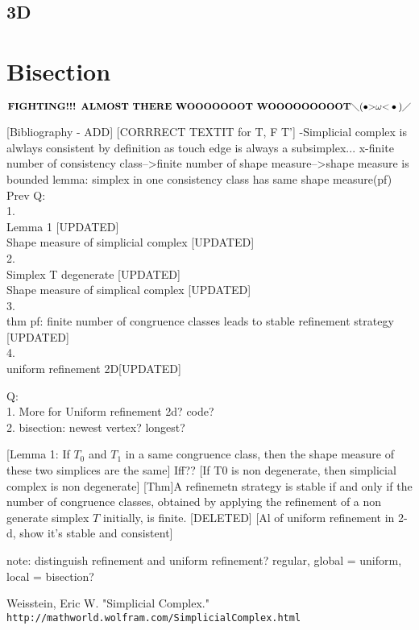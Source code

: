 \documentclass{article}
\begin{document}
    \subsection{3D}

    \section{Bisection}

    \newpage
    $\textbf{FIGHTING!!! ALMOST THERE WOOOOOOOT WOOOOOOOOOT}  \diagdown{(\bullet{ > }\omega{ < }\bullet{})} \diagup{}$


    [Bibliography - ADD]
    [CORRRECT TEXTIT for T, F T']
    -Simplicial complex is alwlays consistent by definition as touch edge is always a subsimplex...
    x-finite number of consistency class-->finite number of shape measure-->shape measure is bounded
    lemma: simplex in one consistency class has same shape measure(pf)
    \newpage
    Prev Q:\\
    1.\\
    Lemma 1 [UPDATED]\\
    Shape measure of simplicial complex [UPDATED]\\
    2. \\
    Simplex T degenerate [UPDATED]\\
    Shape measure of simplical complex  [UPDATED]\\
    3. \\
    thm pf: finite number of congruence classes leads to stable refinement strategy [UPDATED]\\
    4. \\
    uniform refinement 2D[UPDATED]

    Q:\\
    1. More for Uniform refinement 2d? code?\\
    2.
    bisection: newest vertex? longest?
   

    [Lemma 1: If $T_0$ and $T_1$ in a same congruence class, then the shape measure of these two simplices are the same] Iff??
    [If T0 is non degenerate, then simplicial complex is non degenerate]
    [Thm]A refinemetn strategy is stable if and only if the number of congruence classes, obtained by applying the refinement of a non generate simplex $T$ initially, is finite. [DELETED]
    [Al of uniform refinement in 2-d, show it's stable and consistent]

    note: distinguish refinement and uniform refinement? regular, global = uniform, local = bisection?


\newpage
\begin{thebibliography}{9}
Weisstein, Eric W. "Simplicial Complex."
\\\texttt{http://mathworld.wolfram.com/SimplicialComplex.html}

\end{thebibliography}

\end{document}
